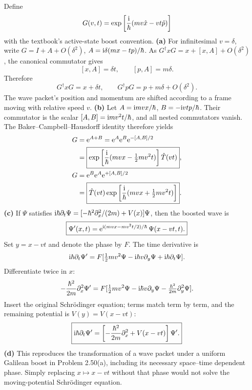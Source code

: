 Define
\[
G(v,t)=\exp\left[
\frac{\mathrm i}{\hbar}(mv\hat x-vt\hat p)\right]
\]
with the textbook's active-state
boost convention.
\textbf{(a)} For infinitesimal $v=\delta$,
write $G=I+A+O(\delta^2)$,
$A=\mathrm i\delta(mx-tp)/\hbar$.
As $G^\dagger xG=x+[x,A]+O(\delta^2)$,
the canonical commutator gives
\[
[x,A]=\delta t,\qquad
[p,A]=m\delta.
\]
Therefore
\begin{equation}
\boxed{G^\dagger xG=x+\delta t,\qquad
G^\dagger pG=p+m\delta+O(\delta^2).}
\end{equation}
The wave packet's position and
momentum are shifted according to
a frame moving with relative speed $v$.
\textbf{(b)} Let
$A=\mathrm i mvx/\hbar$, $B=-\mathrm i vt p/\hbar$.
Their commutator is the scalar
$[A,B]=\mathrm i mv^2t/\hbar$, and all
nested commutators vanish.
The Baker--Campbell--Hausdorff
identity therefore yields
\begin{align}
G&=\mathrm e^{A+B}
=\mathrm e^{A}\mathrm e^{B}\mathrm e^{-[A,B]/2}\\
&=\boxed{
\exp\left[\frac{\mathrm i}{\hbar}
(mvx-\tfrac12mv^2t)\right]\hat T(vt)},\\
G&=\mathrm e^{B}\mathrm e^{A}\mathrm e^{+[A,B]/2}\\
&=\boxed{\hat T(vt)
\exp\left[\frac{\mathrm i}{\hbar}
(mvx+\tfrac12mv^2t)\right]}.
\end{align}
\textbf{(c)} If $\Psi$ satisfies
$\mathrm i\hbar\partial_t\Psi=
[-\hbar^2\partial_x^2/(2m)+V(x)]\Psi$,
then the boosted wave is
\begin{equation}
\boxed{\Psi'(x,t)=
\mathrm e^{\mathrm i(mvx-mv^2t/2)/\hbar}\,
\Psi(x-vt,t).}
\end{equation}
Set $y=x-vt$ and denote the phase
by $F$. The time derivative is
\[
\mathrm i\hbar\partial_t\Psi'
=F[\tfrac12mv^2\Psi-\mathrm i\hbar v\partial_y\Psi+
\mathrm i\hbar\partial_t\Psi].
\]
Differentiate twice in $x$:
\[
-\frac{\hbar^2}{2m}\partial_x^2\Psi'
=F[\tfrac12mv^2\Psi-\mathrm i\hbar v\partial_y\Psi
-\tfrac{\hbar^2}{2m}\partial_y^2\Psi].
\]
Insert the original Schrödinger
equation; terms match term by term,
and the remaining potential is
$V(y)=V(x-vt)$:
\begin{equation}
\boxed{\mathrm i\hbar\partial_t\Psi'
=\left[-\frac{\hbar^2}{2m}\partial_x^2
+V(x-vt)\right]\Psi'.}
\end{equation}
\textbf{(d)} This reproduces the
transformation of a wave packet
under a uniform Galilean boost
in Problem 2.50(a), including its
necessary space--time dependent
phase. Simply replacing
$x\mapsto x-vt$ without that phase
would not solve the moving-potential
Schrödinger equation.

